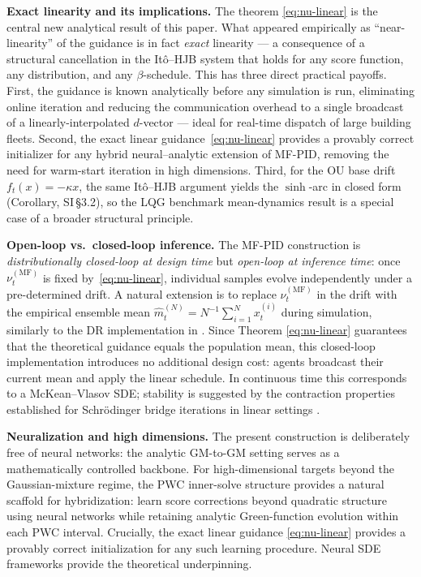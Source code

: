 \documentclass[11pt,onecolumn]{article}
\newcommand{\MF}{\mathrm{MF}}
\begin{document}
\textbf{Exact linearity and its implications.} The theorem \eqref{eq:nu-linear} is the central new analytical result of this paper. What appeared empirically as ``near-linearity'' of the guidance is in fact \emph{exact} linearity --- a consequence of a structural cancellation in the It\^o--HJB system that holds for any score function, any distribution, and any $\beta$-schedule. This has three direct practical payoffs. First, the guidance is known analytically before any simulation is run, eliminating online iteration and reducing the communication overhead to a single broadcast of a linearly-interpolated $d$-vector --- ideal for real-time dispatch of large building fleets. Second, the exact linear guidance~\eqref{eq:nu-linear} provides a provably correct initializer for any hybrid neural--analytic extension of MF-PID, removing the need for warm-start iteration in high dimensions. Third, for the OU base drift $f_t(x)=-\kappa x$, the same It\^o--HJB argument yields the $\sinh$-arc in closed form (Corollary, SI\,\S3.2), so the LQG benchmark mean-dynamics result is a special case of a broader structural principle.

\textbf{Open-loop vs.\ closed-loop inference.} The MF-PID construction is \emph{distributionally closed-loop at design time} but \emph{open-loop at inference time}: once $\nu_t^{(\MF)}$ is fixed by~\eqref{eq:nu-linear}, individual samples evolve independently under a pre-determined drift. A natural extension is to replace $\nu_t^{(\MF)}$ in the drift with the empirical ensemble mean $\hat m_t^{(N)} = N^{-1}\sum_{i=1}^N x_t^{(i)}$ during simulation, similarly to the DR implementation in \cite{metivier_mean-field_2020}. Since Theorem \eqref{eq:nu-linear} guarantees that the theoretical guidance equals the population mean, this closed-loop implementation introduces no additional design cost: agents broadcast their current mean and apply the linear schedule. In continuous time this corresponds to a McKean--Vlasov SDE; stability is suggested by the contraction properties established for Schr\"odinger bridge iterations in linear settings \cite{teter_contraction_2023}.

\textbf{Neuralization and high dimensions.} The present construction is deliberately free of neural networks: the analytic GM-to-GM setting serves as a mathematically controlled backbone. For high-dimensional targets beyond the Gaussian-mixture regime, the PWC inner-solve structure provides a natural scaffold for hybridization: learn score corrections beyond quadratic structure using neural networks while retaining analytic Green-function evolution within each PWC interval. Crucially, the exact linear guidance \eqref{eq:nu-linear} provides a provably correct initialization for any such learning procedure. Neural SDE frameworks \cite{tzen_theoretical_2019} provide the theoretical underpinning.
\end{document}
